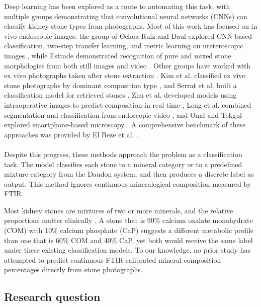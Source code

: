 \documentclass[10pt,twocolumn]{article}
\begin{document}
Deep learning has been explored as a route to automating this task, with multiple groups demonstrating that convolutional neural networks (CNNs) can classify kidney stone types from photographs. Most of this work has focused on in vivo endoscopic images: the group of Ochoa-Ruiz and Daul explored CNN-based classification, two-step transfer learning, and metric learning on ureteroscopic images \cite{LopezTiro2021, LopezTiro2024, GonzalezZapata2024}, while Estrade demonstrated recognition of pure and mixed stone morphologies from both still images and video \cite{Estrade2022, Estrade2022video}. Other groups have worked with ex vivo photographs taken after stone extraction \cite{Black2020}. Kim et al. classified ex vivo stone photographs by dominant composition type \cite{Kim2022}, and Serrat et al. built a classification model for retrieved stones \cite{Serrat2017}. Zhu et al. developed models using intraoperative images to predict composition in real time \cite{Zhu2024}, Leng et al. combined segmentation and classification from endoscopic video \cite{Leng2024}, and Onal and Tekgul explored smartphone-based microscopy \cite{Onal2022}. A comprehensive benchmark of these approaches was provided by El Beze et al. \cite{ElBeze2022}.

\paragraph{}

Despite this progress, these methods approach the problem as a classification task. The model classifies each stone to a mineral category or to a predefined mixture category from the Daudon system, and then produces a discrete label as output. This method ignores continuous mineralogical composition measured by FTIR.

Most kidney stones are mixtures of two or more minerals, and the relative proportions matter clinically \cite{Daudon2016}. A stone that is 90\% calcium oxalate monohydrate (COM) with 10\% calcium phosphate (CaP) suggests a different metabolic profile than one that is 60\% COM and 40\% CaP, yet both would receive the same label under these existing classification models. To our knowledge, no prior study has attempted to predict continuous FTIR-calibrated mineral composition percentages directly from stone photographs.

\subsection*{Research question}
\end{document}
